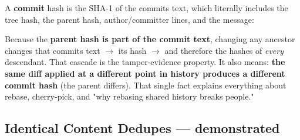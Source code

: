 \documentclass[11pt]{article}
\newenvironment{Shaded}{\begin{snugshade}}{\end{snugshade}}
\newcommand{\AttributeTok}[1]{\textcolor[rgb]{0.16,0.50,0.73}{#1}}
\newcommand{\CommentTok}[1]{\textcolor[rgb]{0.48,0.49,0.49}{#1}}
\newcommand{\ExtensionTok}[1]{\textcolor[rgb]{0.00,0.60,1.00}{\textbf{#1}}}
\newcommand{\NormalTok}[1]{\textcolor[rgb]{0.81,0.81,0.76}{#1}}
\newcommand{\OperatorTok}[1]{\textcolor[rgb]{0.81,0.81,0.76}{#1}}
\newcommand{\StringTok}[1]{\textcolor[rgb]{0.96,0.31,0.31}{#1}}
\begin{document}
A \textbf{commit} hash is the SHA-1 of the commit\textquotesingle s text, which literally includes the tree hash, the parent hash, author/committer lines, and the message:


\begin{Shaded}
\end{Shaded}

Because the \textbf{parent hash is part of the commit text}, changing any ancestor changes that commit\textquotesingle s text \(\rightarrow\) its hash \(\rightarrow\) and therefore the hashes of \emph{every} descendant. That cascade is the tamper-evidence property. It also means: \textbf{the same diff applied at a different point in history produces a different commit hash} (the parent differs). That single fact explains everything about rebase, cherry-pick, and "why rebasing shared history breaks people."

\subsection{Identical Content Dedupes --- demonstrated}\label{identical-content-dedupes--demonstrated}


\begin{Shaded}
\end{Shaded}
\end{document}
